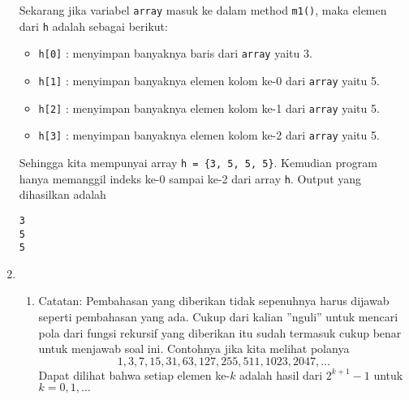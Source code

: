 \documentclass[10pt,openany,a4paper]{article}
\begin{document}
\begin{enumerate}
    Sekarang jika variabel \texttt{array} masuk ke dalam method \texttt{m1()}, maka elemen dari \texttt{h} adalah sebagai berikut:
    \begin{itemize}
        \item \texttt{h[0]} : menyimpan banyaknya baris dari \texttt{array} yaitu 3.
        \item \texttt{h[1]} : menyimpan banyaknya elemen kolom ke-0 dari \texttt{array} yaitu 5.
        \item \texttt{h[2]} : menyimpan banyaknya elemen kolom ke-1 dari \texttt{array} yaitu 5.
        \item \texttt{h[3]} : menyimpan banyaknya elemen kolom ke-2 dari \texttt{array} yaitu 5.
    \end{itemize}
    Sehingga kita mempunyai array \texttt{h = \{3, 5, 5, 5\}}. Kemudian program hanya memanggil indeks ke-0 sampai ke-2 dari array \texttt{h}. Output yang dihasilkan adalah
    \begin{lstlisting}[style=output]
3
5
5
    \end{lstlisting} 

    \item \begin{enumerate}
        \item {\color{red}Catatan: Pembahasan yang diberikan tidak sepenuhnya harus dijawab seperti pembahasan yang ada. Cukup dari kalian ''nguli'' untuk mencari pola dari fungsi rekursif yang diberikan itu sudah termasuk cukup benar untuk menjawab soal ini. Contohnya jika kita melihat polanya
        \[1, 3, 7, 15, 31, 63, 127, 255, 511, 1023, 2047,\ldots\]
        Dapat dilihat bahwa setiap elemen ke-$k$ adalah hasil dari $2^{k+1}-1$ untuk $k=0,1,\dots$}\\
        

\end{enumerate}
\end{enumerate}
\end{document}
